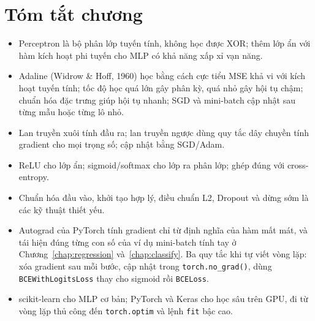 \section{Tóm tắt chương}
\begin{itemize}
    \item Perceptron là bộ phân lớp tuyến tính, không học được XOR; thêm lớp ẩn với hàm kích hoạt phi tuyến cho MLP có khả năng xấp xỉ vạn năng.
    \item Adaline (Widrow \& Hoff, 1960) học bằng cách cực tiểu MSE khả vi với kích hoạt tuyến tính; tốc độ học quá lớn gây phân kỳ, quá nhỏ gây hội tụ chậm; chuẩn hóa đặc trưng giúp hội tụ nhanh; SGD và mini-batch cập nhật sau từng mẫu hoặc từng lô nhỏ.
    \item Lan truyền xuôi tính đầu ra; lan truyền ngược dùng quy tắc dây chuyền tính gradient cho mọi trọng số; cập nhật bằng SGD/Adam.
    \item ReLU cho lớp ẩn; sigmoid/softmax cho lớp ra phân lớp; ghép đúng với cross-entropy.
    \item Chuẩn hóa đầu vào, khởi tạo hợp lý, điều chuẩn L2, Dropout và dừng sớm là các kỹ thuật thiết yếu.
    \item Autograd của PyTorch tính gradient chỉ từ định nghĩa của hàm mất mát, và tái hiện đúng từng con số của ví dụ mini-batch tính tay ở Chương~\ref{chap:regression} và~\ref{chap:classify}. Ba quy tắc khi tự viết vòng lặp: xóa gradient sau mỗi bước, cập nhật trong \texttt{torch.no\_grad()}, dùng \texttt{BCEWithLogitsLoss} thay cho sigmoid rồi \texttt{BCELoss}.
    \item scikit-learn cho MLP cơ bản; PyTorch và Keras cho học sâu trên GPU, đi từ vòng lặp thủ công đến \texttt{torch.optim} và lệnh \texttt{fit} bậc cao.
\end{itemize}

